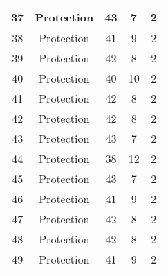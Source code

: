 \documentclass[results.tex]{subfiles}
\begin{document}
\begin{center}
\begin{tabular}{| c || c | c | c | c |}
            \hline
            37                      & Protection                   & 43                     & 7                       & 2                    \\
            \hline
            38                      & Protection                   & 41                     & 9                       & 2                    \\
            \hline
            39                      & Protection                   & 42                     & 8                       & 2                    \\
            \hline
            40                      & Protection                   & 40                     & 10                      & 2                    \\
            \hline
            41                      & Protection                   & 42                     & 8                       & 2                    \\
            \hline
            42                      & Protection                   & 42                     & 8                       & 2                    \\
            \hline
            43                      & Protection                   & 43                     & 7                       & 2                    \\
            \hline
            44                      & Protection                   & 38                     & 12                      & 2                    \\
            \hline
            45                      & Protection                   & 43                     & 7                       & 2                    \\
            \hline
            46                      & Protection                   & 41                     & 9                       & 2                    \\
            \hline
            47                      & Protection                   & 42                     & 8                       & 2                    \\
            \hline
            48                      & Protection                   & 42                     & 8                       & 2                    \\
            \hline
            49                      & Protection                   & 41                     & 9                       & 2                    \\
            \hline
        \end{tabular}
    \end{center}
\end{document}
